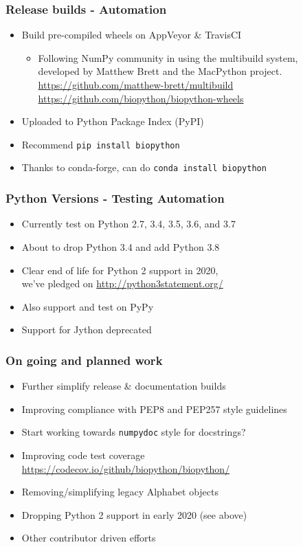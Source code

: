 \begin{frame}
\frametitle{Release builds - Automation}
\begin{itemize}
\item Build pre-compiled wheels on AppVeyor \& TravisCI
    \begin{itemize}
        \item Following NumPy community in using the multibuild system, \\
              developed by Matthew Brett and the MacPython project. \\
              \url{https://github.com/matthew-brett/multibuild} \\
              \url{https://github.com/biopython/biopython-wheels}
    \end{itemize}
\item Uploaded to Python Package Index (PyPI)
\item Recommend \texttt{pip install biopython}
\item Thanks to conda-forge, can do \texttt{conda install biopython}
\end{itemize}
\end{frame}


\begin{frame}
\frametitle{Python Versions - Testing Automation}
\begin{itemize}
\item Currently test on Python 2.7, 3.4, 3.5, 3.6, and 3.7
\item About to drop Python 3.4 and add Python 3.8
\item Clear end of life for Python 2 support in 2020, \\ we've pledged on \url{http://python3statement.org/}
\item Also support and test on PyPy
\item Support for Jython deprecated
\end{itemize}
\end{frame}


\begin{frame}
\frametitle{On going and planned work}
\begin{itemize}
    \item Further simplify release \& documentation builds
    \item Improving compliance with PEP8 and PEP257 style guidelines
    \item Start working towards \texttt{numpydoc} style for docstrings?
    \item Improving code test coverage \url{https://codecov.io/github/biopython/biopython/}
    \item Removing/simplifying  legacy Alphabet objects
    \item Dropping Python 2 support in early 2020 (see above)
    \item Other contributor driven efforts
\end{itemize}
\end{frame}


